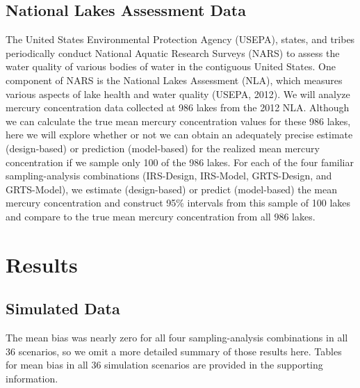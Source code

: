 \documentclass[]{elsarticle} %
\begin{document}
\hypertarget{sec:mm_app}{%
\subsection{National Lakes Assessment Data}\label{sec:mm_app}}

The United States Environmental Protection Agency (USEPA), states, and
tribes periodically conduct National Aquatic Research Surveys (NARS) to
assess the water quality of various bodies of water in the contiguous
United States. One component of NARS is the National Lakes Assessment
(NLA), which measures various aspects of lake health and water quality
(USEPA, 2012). We will analyze mercury concentration data collected at
986 lakes from the 2012 NLA. Although we can calculate the true mean
mercury concentration values for these 986 lakes, here we will explore
whether or not we can obtain an adequately precise estimate
(design-based) or prediction (model-based) for the realized mean mercury
concentration if we sample only 100 of the 986 lakes. For each of the
four familiar sampling-analysis combinations (IRS-Design, IRS-Model,
GRTS-Design, and GRTS-Model), we estimate (design-based) or predict
(model-based) the mean mercury concentration and construct 95\%
intervals from this sample of 100 lakes and compare to the true mean
mercury concentration from all 986 lakes.

\hypertarget{sec:results}{%
\section{Results}\label{sec:results}}

\hypertarget{sec:r_sim}{%
\subsection{Simulated Data}\label{sec:r_sim}}

The mean bias was nearly zero for all four sampling-analysis
combinations in all 36 scenarios, so we omit a more detailed summary of
those results here. Tables for mean bias in all 36 simulation scenarios
are provided in the supporting information.
\end{document}
